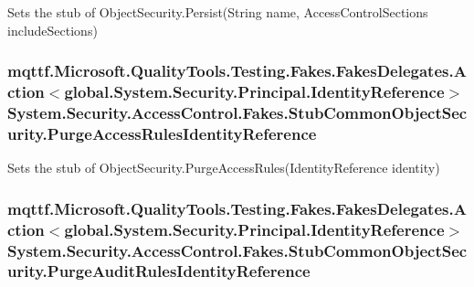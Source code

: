 Sets the stub of Object\-Security.\-Persist(\-String name, Access\-Control\-Sections include\-Sections)

\hypertarget{class_system_1_1_security_1_1_access_control_1_1_fakes_1_1_stub_common_object_security_a36886f1c5720c7962a38ca4d7e27131e}{
\subsubsection[{Purge\-Access\-Rules\-Identity\-Reference}]{\setlength{\rightskip}{0pt plus 5cm}mqttf.\-Microsoft.\-Quality\-Tools.\-Testing.\-Fakes.\-Fakes\-Delegates.\-Action$<$global.\-System.\-Security.\-Principal.\-Identity\-Reference$>$ System.\-Security.\-Access\-Control.\-Fakes.\-Stub\-Common\-Object\-Security.\-Purge\-Access\-Rules\-Identity\-Reference}}\label{class_system_1_1_security_1_1_access_control_1_1_fakes_1_1_stub_common_object_security_a36886f1c5720c7962a38ca4d7e27131e}


Sets the stub of Object\-Security.\-Purge\-Access\-Rules(\-Identity\-Reference identity)

\hypertarget{class_system_1_1_security_1_1_access_control_1_1_fakes_1_1_stub_common_object_security_a0114be0b76d3d3172cfe01b4c5947554}{
\subsubsection[{Purge\-Audit\-Rules\-Identity\-Reference}]{\setlength{\rightskip}{0pt plus 5cm}mqttf.\-Microsoft.\-Quality\-Tools.\-Testing.\-Fakes.\-Fakes\-Delegates.\-Action$<$global.\-System.\-Security.\-Principal.\-Identity\-Reference$>$ System.\-Security.\-Access\-Control.\-Fakes.\-Stub\-Common\-Object\-Security.\-Purge\-Audit\-Rules\-Identity\-Reference}}\label{class_system_1_1_security_1_1_access_control_1_1_fakes_1_1_stub_common_object_security_a0114be0b76d3d3172cfe01b4c5947554}


